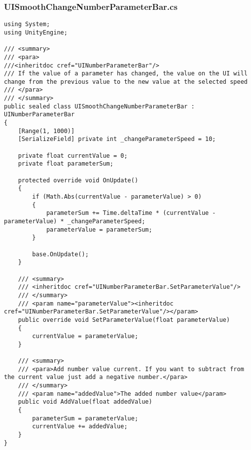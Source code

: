 \subsubsection*{UISmoothChangeNumberParameterBar.cs}
\begin{verbatim}
using System;
using UnityEngine;

/// <summary>
/// <para>
///<inheritdoc cref="UINumberParameterBar"/>
/// If the value of a parameter has changed, the value on the UI will change from the previous value to the new value at the selected speed
/// </para>
/// </summary>
public sealed class UISmoothChangeNumberParameterBar : UINumberParameterBar
{
    [Range(1, 1000)]
    [SerializeField] private int _changeParameterSpeed = 10;

    private float currentValue = 0;
    private float parameterSum;

    protected override void OnUpdate()
    {
        if (Math.Abs(currentValue - parameterValue) > 0)
        {
            parameterSum += Time.deltaTime * (currentValue - parameterValue) * _changeParameterSpeed;
            parameterValue = parameterSum;
        }

        base.OnUpdate();
    }

    /// <summary>
    /// <inheritdoc cref="UINumberParameterBar.SetParameterValue"/>
    /// </summary>
    /// <param name="parameterValue"><inheritdoc cref="UINumberParameterBar.SetParameterValue"/></param>
    public override void SetParameterValue(float parameterValue)
    {
        currentValue = parameterValue;
    }

    /// <summary>
    /// <para>Add number value current. If you want to subtract from the current value just add a negative number.</para>
    /// </summary>
    /// <param name="addedValue">The added number value</param>
    public void AddValue(float addedValue)
    {
        parameterSum = parameterValue;
        currentValue += addedValue;
    }
}
\end{verbatim}
